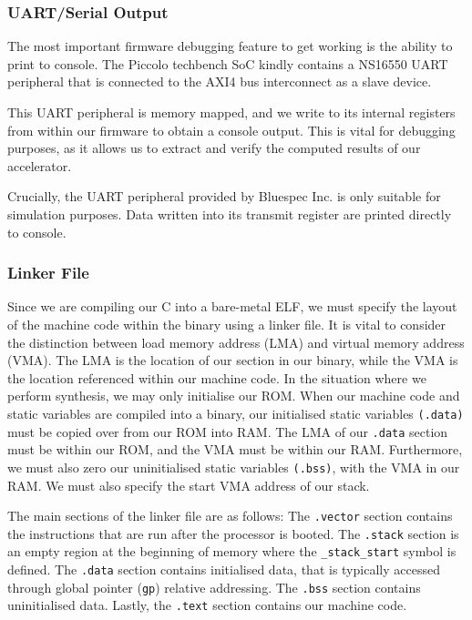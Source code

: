 \documentclass[a4paper,8pt]{report}
\begin{document}
\subsubsection{UART/Serial Output}
The most important firmware debugging feature to get working is the ability to
print to console. The Piccolo techbench SoC kindly contains a NS16550 UART
peripheral that is connected to the AXI4 bus interconnect as a slave device.  

This UART peripheral is memory mapped, and we write to its internal registers
from within our firmware to obtain a console output. This is vital for debugging
purposes, as it allows us to extract and verify the computed results of our
accelerator.

Crucially, the UART peripheral provided by Bluespec Inc. is only suitable for
simulation purposes. Data written into its transmit register are printed
directly to console. 

\subsubsection{Linker File}
Since we are compiling our C into a bare-metal ELF, we must specify the layout
of the machine code within the binary using a linker file.
It is vital to consider the distinction between load memory address (LMA) and
virtual memory address (VMA). The LMA is the location of our section in our
binary, while the VMA is the location
referenced within our machine code. In the situation where we perform synthesis,
we may only initialise our ROM. When our machine code and static variables are
compiled into a binary, our initialised static variables \texttt{(.data)} must
be copied over from our ROM into RAM. The LMA of our \texttt{.data} section must
be within our ROM, and the VMA must be within our RAM. Furthermore, we must also
zero our uninitialised static variables \texttt{(.bss)}, with the VMA in our
RAM. We must also specify the start VMA address of our stack.

The main sections of the linker file are as follows: The \texttt{.vector}
section contains the instructions that are run after the processor is booted.
The \texttt{.stack} section is an empty region at the beginning of memory
where the \texttt{\_stack\_start} symbol is defined. The \texttt{.data} section
contains initialised data, that is typically accessed through global pointer
(\texttt{gp}) relative addressing. The \texttt{.bss} section contains
uninitialised data. Lastly, the \texttt{.text} section contains our machine
code.
\end{document}
